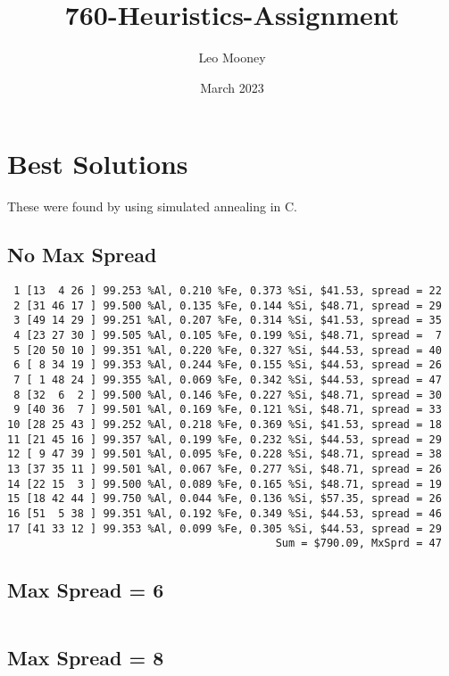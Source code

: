 \documentclass{article}
\title{760-Heuristics-Assignment}
\author{Leo Mooney}
\date{March 2023}
\begin{document}
\maketitle

\section{Best Solutions}
These were found by using simulated annealing in C.

\subsection{No Max Spread}
\begin{verbatim}
 1 [13  4 26 ] 99.253 %Al, 0.210 %Fe, 0.373 %Si, $41.53, spread = 22
 2 [31 46 17 ] 99.500 %Al, 0.135 %Fe, 0.144 %Si, $48.71, spread = 29
 3 [49 14 29 ] 99.251 %Al, 0.207 %Fe, 0.314 %Si, $41.53, spread = 35
 4 [23 27 30 ] 99.505 %Al, 0.105 %Fe, 0.199 %Si, $48.71, spread =  7
 5 [20 50 10 ] 99.351 %Al, 0.220 %Fe, 0.327 %Si, $44.53, spread = 40
 6 [ 8 34 19 ] 99.353 %Al, 0.244 %Fe, 0.155 %Si, $44.53, spread = 26
 7 [ 1 48 24 ] 99.355 %Al, 0.069 %Fe, 0.342 %Si, $44.53, spread = 47
 8 [32  6  2 ] 99.500 %Al, 0.146 %Fe, 0.227 %Si, $48.71, spread = 30
 9 [40 36  7 ] 99.501 %Al, 0.169 %Fe, 0.121 %Si, $48.71, spread = 33
10 [28 25 43 ] 99.252 %Al, 0.218 %Fe, 0.369 %Si, $41.53, spread = 18
11 [21 45 16 ] 99.357 %Al, 0.199 %Fe, 0.232 %Si, $44.53, spread = 29
12 [ 9 47 39 ] 99.501 %Al, 0.095 %Fe, 0.228 %Si, $48.71, spread = 38
13 [37 35 11 ] 99.501 %Al, 0.067 %Fe, 0.277 %Si, $48.71, spread = 26
14 [22 15  3 ] 99.500 %Al, 0.089 %Fe, 0.165 %Si, $48.71, spread = 19
15 [18 42 44 ] 99.750 %Al, 0.044 %Fe, 0.136 %Si, $57.35, spread = 26
16 [51  5 38 ] 99.351 %Al, 0.192 %Fe, 0.349 %Si, $44.53, spread = 46
17 [41 33 12 ] 99.353 %Al, 0.099 %Fe, 0.305 %Si, $44.53, spread = 29
                                          Sum = $790.09, MxSprd = 47
\end{verbatim}

\subsection{Max Spread = 6}
\begin{verbatim}
\end{verbatim}
\subsection{Max Spread = 8}
\begin{verbatim}
\end{verbatim}
\end{document}
